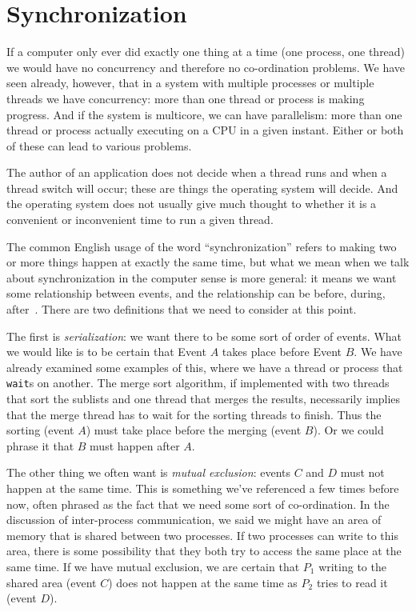 




\section*{Synchronization}
If a computer only ever did exactly one thing at a time (one process, one thread) we would have no concurrency and therefore no  co-ordination problems. We have seen already, however, that in a system with multiple processes or multiple threads we have concurrency: more than one thread or process is making progress. And if the system is multicore, we can have parallelism: more than one thread or process actually executing on a CPU in a given instant. Either or both of these can lead to various problems.

The author of an application does not decide when a thread runs and when a thread switch will occur; these are things the operating system will decide. And the operating system does not usually give much thought to whether it is a convenient or inconvenient time to run a given thread.

The common English usage of the word ``synchronization'' refers to making two or more things happen at exactly the same time, but what we mean when we talk about synchronization in the computer sense is more general: it means we want some relationship between events, and the relationship can be before, during, after~\cite{lbs}. There are two definitions that we need to consider at this point.

The first is \textit{serialization}: we want there to be some sort of order of events. What we would like is to be certain that Event $A$ takes place before Event $B$. We have already examined some examples of this, where we have a thread or process that \texttt{wait}s on another. The merge sort algorithm, if implemented with two threads that sort the sublists and one thread that merges the results, necessarily implies that the merge thread has to wait for the sorting threads to finish. Thus the sorting (event $A$) must take place before the merging (event $B$). Or we could phrase it that $B$ must happen after $A$.

The other thing we often want is \textit{mutual exclusion}: events $C$ and $D$ must not happen at the same time. This is something we've referenced a few times before now, often phrased as the fact that we need some sort of co-ordination. In the discussion of inter-process communication, we said we might have an area of memory that is shared between two processes. If two processes can write to this area, there is some possibility that they both try to access the same place at the same time. If we have mutual exclusion, we are certain that $P_{1}$ writing to the shared area (event $C$) does not happen at the same time as $P_{2}$ tries to read it (event $D$).




